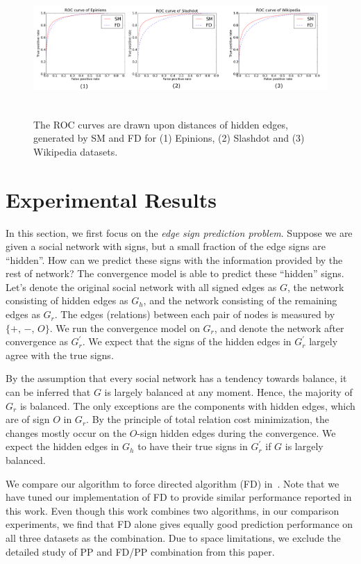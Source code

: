 
\begin{figure}[thbp!]
\centering
\includegraphics[height=2in]{Figs/ROC_curve_hor.pdf}
\vspace*{-0.1in}
\caption{\label{fig:ROC}The ROC curves are drawn upon distances of
  hidden edges, generated by SM and FD for (1) Epinions, (2) Slashdot
  and (3) Wikipedia datasets.}
\end{figure}


\section{Experimental Results} \label{sec:results}
In this section, we first focus on the {\it edge sign prediction
  problem}. Suppose we are given a social network with signs, but a
small fraction of the edge signs are ``hidden''. How can we predict
these signs with the information provided by the rest of network?
The convergence model is able to predict these ``hidden'' signs. Let's
denote the original social network with all signed edges as $G$, the
network consisting of hidden edges as $G_{h}$, and the network
consisting of the remaining edges as $G_{r}$. The edges (relations)
between each pair of nodes is measured by $\{+,\,-,\,O\}$. We run the
convergence model on $G_{r}$, and denote the network after convergence
as $G_{r}^{'}$. We expect that the signs of the hidden edges in
$G_{r}^{'}$ largely agree with the true signs.

By the assumption that every social network has a tendency towards
balance, it can be inferred that $G$ is largely balanced at any
moment. Hence, the majority of $G_{r}$ is balanced. The only
exceptions are the components with hidden edges, which are of sign $O$
in $G_{r}$. By the principle of total relation cost minimization, the
changes mostly occur on the $O$-sign hidden edges during the
convergence. We expect the hidden edges in $G_h$ to have their
true signs in $G_{r}^{'}$ if $G$ is largely balanced.

We compare our algorithm to force directed algorithm (FD)
in~\cite{golbeck:distrust2011}. Note that we have tuned our
implementation of FD to provide similar performance reported in this
work. Even though this work combines two algorithms, in our comparison
experiments, we find that FD alone gives equally good prediction
performance on all three datasets as the combination. Due to space
limitations, we exclude the detailed study of PP and FD/PP combination
from this paper.


